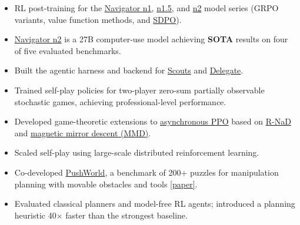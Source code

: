 \documentclass[10pt,a4paper,ragged2e]{altacv}
\begin{document}

\begin{itemize}
    \item RL post-training for the \href{https://yutori.com/blog/introducing-n1}{Navigator n1}, \href{https://yutori.com/blog/introducing-n1-5}{n1.5}, and \href{https://yutori.com/blog/introducing-n2}{n2} model series (GRPO variants, value function methods, and \href{https://arxiv.org/abs/2601.20802}{SDPO}).
    \item \href{https://yutori.com/blog/introducing-n2}{Navigator n2} is a 27B computer-use model achieving \textbf{SOTA} results on four of five evaluated benchmarks.
    \item Built the agentic harness and backend for \href{https://yutori.com/scouts}{Scouts} and \href{https://yutori.com/delegate}{Delegate}.
\end{itemize}

\divider

\begin{itemize}
    \item Trained self-play policies for two-player zero-sum partially observable stochastic games, achieving professional-level performance.
    \item Developed game-theoretic extensions to \href{https://arxiv.org/pdf/1912.00167}{asynchronous PPO} based on \href{https://arxiv.org/pdf/2206.15378}{R-NaD} and \href{https://arxiv.org/pdf/2206.05825}{magnetic mirror descent (MMD)}.
    \item Scaled self-play using large-scale distributed reinforcement learning.
\end{itemize}

\divider

\begin{itemize}
    \item Co-developed \href{https://deepmind-pushworld.github.io/play/}{PushWorld}, a benchmark of 200+ puzzles for manipulation planning with movable obstacles and tools \href{https://arxiv.org/abs/2301.10289}{[paper]}.
    \item Evaluated classical planners and model-free RL agents; introduced a planning heuristic 40$\times$ faster than the strongest baseline.
\end{itemize}
\end{document}
